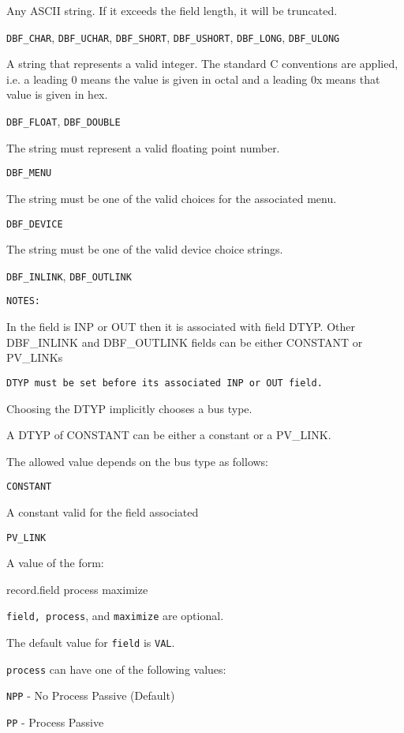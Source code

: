 Any ASCII string. If it exceeds the field length, it will be truncated.

\verb|DBF_CHAR|, \verb|DBF_UCHAR|, \verb|DBF_SHORT|, \verb|DBF_USHORT|, \verb|DBF_LONG|, \verb|DBF_ULONG|

A string that represents a valid integer. The standard C conventions are applied, i.e. a leading 0 means the 
value is given in octal and a leading 0x means that value is given in hex.

\verb|DBF_FLOAT|, \verb|DBF_DOUBLE|

The string must represent a valid floating point number.

\verb|DBF_MENU|

The string must be one of the valid choices for the associated menu.

\verb|DBF_DEVICE|

The string must be one of the valid device choice strings.

\verb|DBF_INLINK|, \verb|DBF_OUTLINK|

\verb|NOTES:|

In the field is INP or OUT then it is associated with field DTYP. Other DBF\_INLINK and 
DBF\_OUTLINK fields can be either CONSTANT or PV\_LINKs

\verb|DTYP must be set before its associated INP or OUT field.|

Choosing the DTYP implicitly chooses a bus type.

A DTYP of CONSTANT can be either a constant or a PV\_LINK.



The allowed value depends on the bus type as follows:

\verb|CONSTANT|

A constant valid for the field associated 

\verb|PV_LINK|

A value of the form:



    record.field process maximize


\verb|field, process|, and \verb|maximize| are optional. 

The default value for \verb|field| is \verb|VAL|.

\verb|process| can have one of the following values:

\verb|NPP| - No Process Passive (Default)

\verb|PP| - Process Passive

